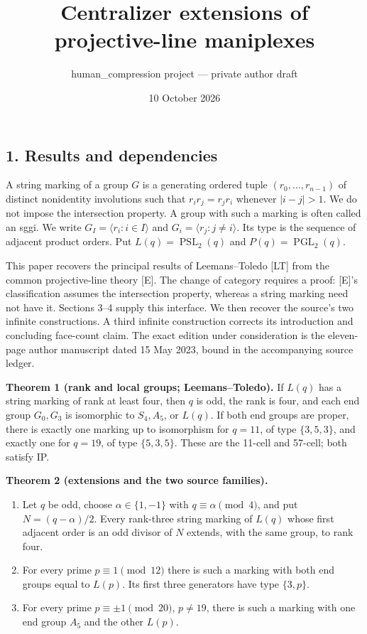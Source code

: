 \documentclass[
  11pt,
]{article}
\title{Centralizer extensions of projective-line maniplexes}
\author{human\_compression project --- private author draft}
\date{10 October 2026}
\providecommand{\tightlist}{%
  \setlength{\itemsep}{0pt}\setlength{\parskip}{0pt}}
\begin{document}
\maketitle

\subsection{1. Results and dependencies}\label{results-and-dependencies}

A string marking of a group \(G\) is a generating ordered tuple
\((r_0,\ldots,r_{n-1})\) of distinct nonidentity involutions such that
\(r_i r_j=r_j r_i\) whenever \(|i-j|>1\). We do not impose the
intersection property. A group with such a marking is often called an
sggi. We write \(G_I=\langle r_i:i\in I\rangle\) and
\(G_i=\langle r_j:j\ne i\rangle\). Its type is the sequence of adjacent
product orders. Put \(L(q)=\operatorname{PSL}_2(q)\) and
\(P(q)=\operatorname{PGL}_2(q)\).

This paper recovers the principal results of Leemans--Toledo {[}LT{]}
from the common projective-line theory {[}E{]}. The change of category
requires a proof: {[}E{]}'s classification assumes the intersection
property, whereas a string marking need not have it. Sections 3--4
supply this interface. We then recover the source's two infinite
constructions. A third infinite construction corrects its introduction
and concluding face-count claim. The exact edition under consideration
is the eleven-page author manuscript dated 15 May 2023, bound in the
accompanying source ledger.

\textbf{Theorem 1 (rank and local groups; Leemans--Toledo).} If \(L(q)\)
has a string marking of rank at least four, then \(q\) is odd, the rank
is four, and each end group \(G_0,G_3\) is isomorphic to \(S_4,A_5\), or
\(L(q)\). If both end groups are proper, there is exactly one marking up
to isomorphism for \(q=11\), of type \(\{3,5,3\}\), and exactly one for
\(q=19\), of type \(\{5,3,5\}\). These are the 11-cell and 57-cell; both
satisfy IP.

\textbf{Theorem 2 (extensions and the two source families).}

\begin{enumerate}
\def\labelenumi{\arabic{enumi}.}
\tightlist
\item
  Let \(q\) be odd, choose \(\alpha\in\{1,-1\}\) with
  \(q\equiv\alpha\pmod4\), and put \(N=(q-\alpha)/2\). Every rank-three
  string marking of \(L(q)\) whose first adjacent order is an odd
  divisor of \(N\) extends, with the same group, to rank four.
\item
  For every prime \(p\equiv1\pmod{12}\) there is such a marking with
  both end groups equal to \(L(p)\). Its first three generators have
  type \(\{3,p\}\).
\item
  For every prime \(p\equiv\pm1\pmod{20}\), \(p\ne19\), there is such a
  marking with one end group \(A_5\) and the other \(L(p)\).
\end{enumerate}
\end{document}
